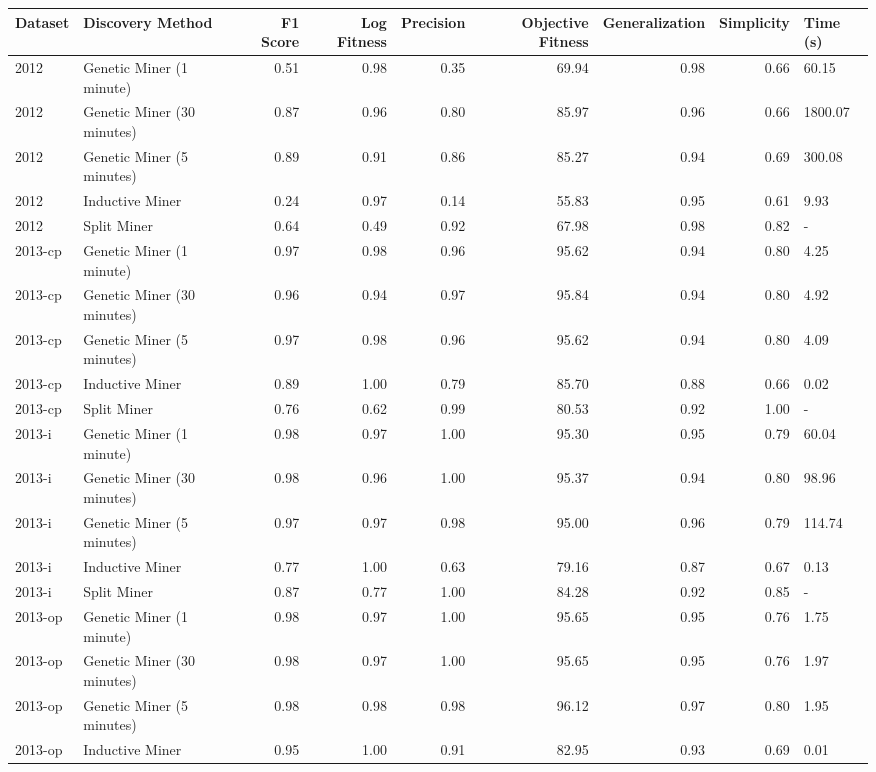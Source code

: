 \begin{tabular}{llrrrrrrl}
\toprule
Dataset & Discovery Method & F1 Score & Log Fitness & Precision & Objective Fitness & Generalization & Simplicity & Time (s) \\
\midrule
2012 & Genetic Miner (1 minute) & 0.51 & 0.98 & 0.35 & 69.94 & 0.98 & 0.66 & 60.15 \\
2012 & Genetic Miner (30 minutes) & 0.87 & 0.96 & 0.80 & 85.97 & 0.96 & 0.66 & 1800.07 \\
2012 & Genetic Miner (5 minutes) & 0.89 & 0.91 & 0.86 & 85.27 & 0.94 & 0.69 & 300.08 \\
2012 & Inductive Miner & 0.24 & 0.97 & 0.14 & 55.83 & 0.95 & 0.61 & 9.93 \\
2012 & Split Miner & 0.64 & 0.49 & 0.92 & 67.98 & 0.98 & 0.82 & - \\
2013-cp & Genetic Miner (1 minute) & 0.97 & 0.98 & 0.96 & 95.62 & 0.94 & 0.80 & 4.25 \\
2013-cp & Genetic Miner (30 minutes) & 0.96 & 0.94 & 0.97 & 95.84 & 0.94 & 0.80 & 4.92 \\
2013-cp & Genetic Miner (5 minutes) & 0.97 & 0.98 & 0.96 & 95.62 & 0.94 & 0.80 & 4.09 \\
2013-cp & Inductive Miner & 0.89 & 1.00 & 0.79 & 85.70 & 0.88 & 0.66 & 0.02 \\
2013-cp & Split Miner & 0.76 & 0.62 & 0.99 & 80.53 & 0.92 & 1.00 & - \\
2013-i & Genetic Miner (1 minute) & 0.98 & 0.97 & 1.00 & 95.30 & 0.95 & 0.79 & 60.04 \\
2013-i & Genetic Miner (30 minutes) & 0.98 & 0.96 & 1.00 & 95.37 & 0.94 & 0.80 & 98.96 \\
2013-i & Genetic Miner (5 minutes) & 0.97 & 0.97 & 0.98 & 95.00 & 0.96 & 0.79 & 114.74 \\
2013-i & Inductive Miner & 0.77 & 1.00 & 0.63 & 79.16 & 0.87 & 0.67 & 0.13 \\
2013-i & Split Miner & 0.87 & 0.77 & 1.00 & 84.28 & 0.92 & 0.85 & - \\
2013-op & Genetic Miner (1 minute) & 0.98 & 0.97 & 1.00 & 95.65 & 0.95 & 0.76 & 1.75 \\
2013-op & Genetic Miner (30 minutes) & 0.98 & 0.97 & 1.00 & 95.65 & 0.95 & 0.76 & 1.97 \\
2013-op & Genetic Miner (5 minutes) & 0.98 & 0.98 & 0.98 & 96.12 & 0.97 & 0.80 & 1.95 \\
2013-op & Inductive Miner & 0.95 & 1.00 & 0.91 & 82.95 & 0.93 & 0.69 & 0.01 \\

\end{tabular}
